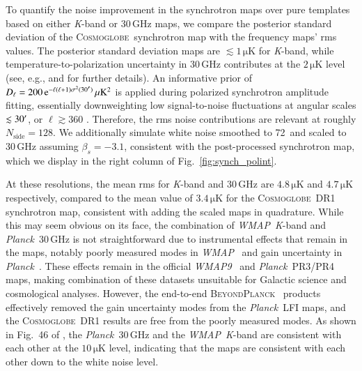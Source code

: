 \documentclass[twocolumn]{../../common/aa}
\def\WMAP{\emph{WMAP}}
\def\WMAPnine{\emph{WMAP9}}
\def\Planck{\emph{Planck}}
\newcommand{\bp}{\textsc{BeyondPlanck}}
\newcommand{\cosmoglobe}{\textsc{Cosmoglobe}}
\newcommand{\K}[0]{\textit K}
\newcommand{\e}{\mathrm e}
\begin{document}
To quantify the noise improvement in the synchrotron maps over pure templates based on either \K-band or 30\,GHz maps, we compare the posterior standard deviation of the \cosmoglobe\ synchrotron map with the frequency maps' rms values. The posterior standard deviation maps are $\lesssim1\,\mathrm{\mu K}$ for \K-band, while temperature-to-polarization uncertainty in 30\,GHz contributes at the $2\,\mathrm{\mu K}$ level (see, e.g., \citealp{watts2023_dr1} and \citealp{bp10} for further details). An informative prior of $D_\ell=200\,\e^{-\ell(\ell+1)\sigma^2(30\arcm)}\,\mathrm{\mu K^2}$ is applied during polarized synchrotron amplitude fitting, essentially downweighting low signal-to-noise fluctuations at angular scales $\lesssim30\arcm$, or $\ell\gtrsim360$ \citep{bp14}. Therefore, the rms noise contributions are relevant at roughly $N_\mathrm{side}=128$. We additionally simulate white noise smoothed to 72\arcm\ and scaled to 30\,GHz assuming $\beta_s=-3.1$, consistent with the post-processed synchrotron map, which we display in the right column of Fig.~\ref{fig:synch_polint}.


At these resolutions, the mean rms for \K-band and 30\,GHz are $4.8\,\mathrm{\mu K}$ and $4.7\,\mathrm{\mu K}$ respectively, compared to the mean value of $3.4\,\mathrm{\mu K}$ for the \cosmoglobe\ DR1 synchrotron map, consistent with adding the scaled maps in quadrature.  While this may seem obvious on its face,  the combination of \WMAP\ \K-band and \Planck\ 30\,GHz is not straightforward due to instrumental effects that remain in the maps, notably poorly measured modes in \WMAP\ \citep{bennett2012,weiland:2018} and gain uncertainty in \Planck\ \citep{planck2016-l02}. These effects remain in the official \WMAPnine\ \citep{bennett2012} and \Planck\ PR3/PR4 \citep{planck2016-l02,planck2020-LVII} maps, making combination of these datasets unsuitable for Galactic science and cosmological analyses. However, the end-to-end \bp\ \citep{bp01} products effectively removed the gain uncertainty modes from the \Planck\ LFI maps, and the \cosmoglobe\ DR1 results \citep{watts2023_dr1} are free from the poorly measured modes. As shown in Fig.~46 of \citet{watts2023_dr1}, the \Planck\ 30\,GHz and the \WMAP\ \K-band are consistent with each other at the $10\,\mathrm{\mu K}$ level, indicating that the maps are consistent with each other down to the white noise level. 
\end{document}
